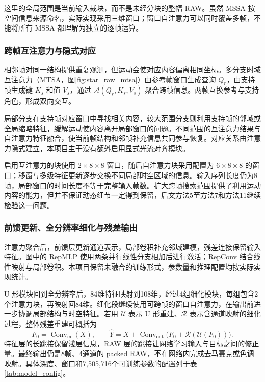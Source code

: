 \documentclass[11pt,a4paper,UTF8,fontset=fandol]{ctexart}
\begin{document}
这里的全局范围是当前输入裁块，而不是未经分块的整幅 RAW。虽然 MSSA 按空间信息来源命名，实际实现采用三维窗口；窗口自注意力可以同时覆盖多帧，不能将所有 MSSA 都理解为独立的逐帧运算。

\subsubsection{跨帧互注意力与隐式对应}

相邻帧对同一结构提供重复观测，但运动会使对应内容偏离相同坐标。多分支时域互注意力（MTSA，图\ref{fig:star_raw_mtsa}）由参考帧窗口生成查询 $Q_r$，由支持帧生成键 $K_s$ 和值 $V_s$，通过 $\mathcal A(Q_r,K_s,V_s)$ 聚合跨帧信息。两帧互换参考与支持角色，形成双向交互。

局部分支在支持帧对应窗口中寻找相关内容，较大范围分支则利用支持帧的邻域或全局缩略特征，缓解运动使内容离开局部窗口的问题。不同范围的互注意力结果与自注意力特征融合，使当前帧结构和邻帧补充信息共同参与恢复。对应关系由注意力隐式建立，本项目主干没有额外启用显式光流对齐模块。

启用互注意力的块使用 $2\times8\times8$ 窗口，随后自注意力块采用配置为 $6\times8\times8$ 的窗口；移窗与多级特征更新逐步交换不同局部时空区域的信息。输入序列长度仍为8帧，局部窗口的时间长度不等于完整输入帧数。扩大跨帧搜索范围提供了利用运动内容的能力，但并不保证动态细节一定得到保留，后文方法5至方法7和方法11继续检验这一问题。

\subsubsection{前馈更新、全分辨率细化与残差输出}

注意力聚合后，前馈层更新通道表示，局部卷积补充邻域建模，残差连接保留输入特征。图中的 RepMLP 使用两条并行线性分支相加后进行激活；RepConv 结合线性映射与局部卷积。本项目保留未融合的训练形式，参数量和推理配置均按实际实现统计。

U 形模块回到全分辨率后，84维特征映射到108维，经过4组细化模块，每组包含2个注意力块，再映射回84维。细化段继续使用可跨帧的窗口自注意力，在输出前进一步协调局部结构与时空特征。若用 $\mathcal U$ 表示 U 形重建、$\mathcal R$ 表示含通道映射的细化过程，整体残差重建可概括为
\begin{equation}
 F_0=\operatorname{Conv}_{\mathrm{in}}(X),\qquad
 \widehat Y=X+\operatorname{Conv}_{\mathrm{out}}\bigl(F_0+\mathcal R(\mathcal U(F_0))\bigr).
 \label{eq:star_reconstruction}
\end{equation}
特征层的长跳接保留浅层信息，RAW 层的跳接让网络学习输入与目标之间的修正量。最终输出仍是8帧、4通道的 packed RAW，不在网络内完成去马赛克或色调映射。具体深度、窗口和7,505,716个可训练参数的配置列于表\ref{tab:model_config}。
\end{document}
